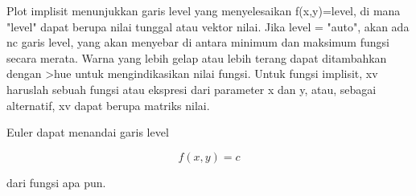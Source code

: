 \documentclass[a4paper,10pt]{article}
\begin{document}
\begin{eulernotebook}
\begin{figure}[h]
\end{figure}
\begin{eulercomment}
Plot implisit menunjukkan garis level yang menyelesaikan f(x,y)=level,
di mana "level" dapat berupa nilai tunggal atau vektor nilai. Jika
level = "auto", akan ada nc garis level, yang akan menyebar di antara
minimum dan maksimum fungsi secara merata. Warna yang lebih gelap atau
lebih terang dapat ditambahkan dengan \textgreater{}hue untuk mengindikasikan nilai
fungsi. Untuk fungsi implisit, xv haruslah sebuah fungsi atau ekspresi
dari parameter x dan y, atau, sebagai alternatif, xv dapat berupa
matriks nilai.

Euler dapat menandai garis level

\end{eulercomment}
\begin{eulerformula}
\[
f(x,y) = c
\]
\end{eulerformula}
\begin{eulercomment}
dari fungsi apa pun.


\end{eulercomment}
\end{eulernotebook}
\end{document}
